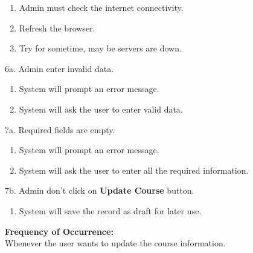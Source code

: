 \begin{enumerate}
\item Admin must check the internet connectivity.
\item Refresh the browser.
\item Try for sometime, may be servers are down.
\end{enumerate}
6a. Admin enter invalid data.
\begin{enumerate}
\item System will prompt an error message.
\item System will ask the user to enter valid data.
\end{enumerate}
7a. Required fields are empty.
\begin{enumerate}
\item System will prompt an error message.
\item System will ask the user to enter all the required information.
\end{enumerate}
7b. Admin don't click on \textbf{Update Course} button.
\begin{enumerate}
\item System will save the record as draft for later use.
\end{enumerate}
\textbf{Frequency of Occurrence:}\\
Whenever the user wants to update the course information.



